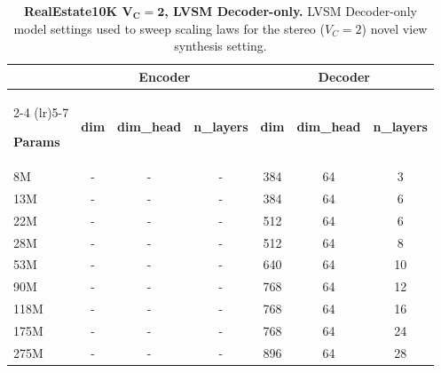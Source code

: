 \begin{table}[t]
\centering
\begin{threeparttable}

\footnotesize            %
\setlength{\tabcolsep}{4pt}  %

\begin{tabular}{lcccccc}   %
\toprule

& \multicolumn{3}{c}{\textbf{Encoder}}
& \multicolumn{3}{c}{\textbf{Decoder}} \\
\cmidrule(lr){2-4} \cmidrule(lr){5-7}

\textbf{Params}
& \textbf{dim} & \textbf{dim\_head} & \textbf{n\_layers}
& \textbf{dim} & \textbf{dim\_head} & \textbf{n\_layers} \\
\midrule

  8M & - & - & - & 384 & 64 & 3 \\
13M & - & - & - & 384 & 64 & 6 \\
22M & - & - & - & 512 & 64 & 6 \\
28M & - & - & - & 512 & 64 & 8 \\
53M & - & - & - & 640 & 64 & 10 \\
90M & - & - & - & 768 & 64 & 12 \\
118M & - & - & - & 768 & 64 & 16 \\
175M & - & - & - & 768 & 64 & 24 \\
275M & - & - & - & 896 & 64 & 28 \\

\bottomrule
\end{tabular}

\caption{\textbf{RealEstate10K $\boldsymbol{V_C}\mathbf{{=}2}$, LVSM Decoder-only.} LVSM Decoder-only model settings used to sweep scaling laws for the stereo ($V_C{=}2$) novel view synthesis setting.}
\label{tab:dec-only-re10k-details}
\vspace{-\baselineskip}
\end{threeparttable}
\end{table}



